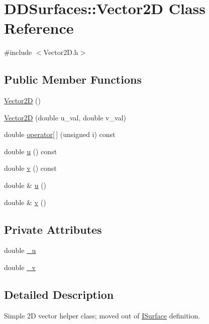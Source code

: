 \hypertarget{class_d_d_surfaces_1_1_vector2_d}{}\section{D\+D\+Surfaces\+:\+:Vector2D Class Reference}
\label{class_d_d_surfaces_1_1_vector2_d}


{\ttfamily \#include $<$Vector2\+D.\+h$>$}

\subsection*{Public Member Functions}
\begin{DoxyCompactItemize}
\item 
\hyperlink{class_d_d_surfaces_1_1_vector2_d_a779bdb4c9b38f3b1c04d8cc56ef78efd}{Vector2D} ()
\item 
\hyperlink{class_d_d_surfaces_1_1_vector2_d_ab41635e717c46f012b11db18f72d145c}{Vector2D} (double u\+\_\+val, double v\+\_\+val)
\item 
double \hyperlink{class_d_d_surfaces_1_1_vector2_d_abcf44b3d1da1b91edbb44bd9af43c65b}{operator\mbox{[}$\,$\mbox{]}} (unsigned i) const
\item 
double \hyperlink{class_d_d_surfaces_1_1_vector2_d_a524469b7edcbcafa2bb633c88e755818}{u} () const
\item 
double \hyperlink{class_d_d_surfaces_1_1_vector2_d_a8d2342cdbd926d05d97c500d9e11866f}{v} () const
\item 
double \& \hyperlink{class_d_d_surfaces_1_1_vector2_d_a366947f28bc5da5b5581186158321489}{u} ()
\item 
double \& \hyperlink{class_d_d_surfaces_1_1_vector2_d_aff280a5b8f8a363199965bc609a02ee0}{v} ()
\end{DoxyCompactItemize}
\subsection*{Private Attributes}
\begin{DoxyCompactItemize}
\item 
double \hyperlink{class_d_d_surfaces_1_1_vector2_d_a168e75ab549555cd365ce3e3e3a48093}{\+\_\+u}
\item 
double \hyperlink{class_d_d_surfaces_1_1_vector2_d_ac52fd163a951a5a29978eb8dad3fc07e}{\+\_\+v}
\end{DoxyCompactItemize}


\subsection{Detailed Description}
Simple 2D vector helper class; moved out of \hyperlink{class_d_d_surfaces_1_1_i_surface}{I\+Surface} definition. 

